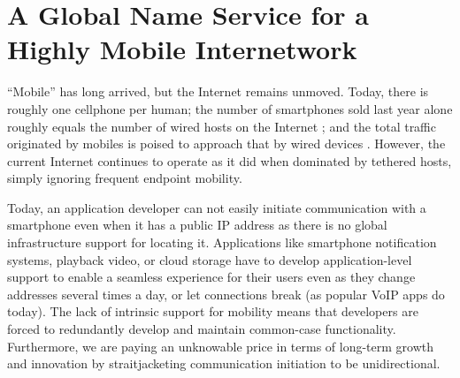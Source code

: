 
\chapter{A Global Name Service for a Highly Mobile Internetwork}
\label{ch:intro-auspice}


``Mobile'' has long arrived, but the Internet remains unmoved. Today, there is roughly one cellphone per human; the number of smartphones sold last year alone roughly equals the number of wired hosts on the Internet \cite{gartner}; and the total traffic originated by mobiles is poised to approach that by wired devices \cite{cisco-vni}. However, the current Internet continues to operate as it did when dominated by tethered hosts, simply ignoring frequent endpoint mobility.

Today, an application developer can not easily initiate communication with a smartphone even when it has a public IP address as there is no global infrastructure support for locating it. Applications like smartphone notification systems, playback video, or cloud storage have to develop application-level support to enable a seamless experience for their users even as they change addresses several times a day, or let connections break (as popular VoIP apps do today).   The lack of intrinsic support for mobility means that developers are forced to redundantly develop and maintain common-case functionality. Furthermore, we are paying an unknowable price in terms of long-term growth and innovation by straitjacketing communication initiation to be unidirectional.



